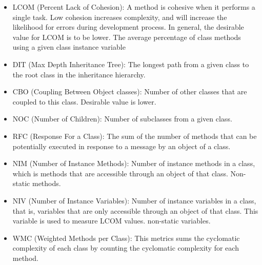 \begin{itemize}
\item LCOM (Percent Lack of Cohesion): A method is cohesive when it performs a single task. Low cohesion increases complexity, and will increase the likelihood for errors during development process. In general, the desirable value for LCOM is to be lower. The average percentage of class methods using a given class instance variable

\item DIT (Max Depth Inheritance Tree): The longest path from a given class to the root class in the inheritance hierarchy.

\item CBO (Coupling Between Object classes): Number of other classes that are coupled to this class. Desirable value is lower. 

\item NOC (Number of Children): Number of subclasses from a given class.

\item RFC (Response For a Class): The sum of the number of methods that can be potentially executed in response to a message by an object of a class.

\item NIM (Number of Instance Methods): Number of instance methods in a class, which is methods that are accessible through an object of that class. Non-static methods.

\item NIV (Number of Instance Variables): Number of instance variables in a class, that is, variables that are only accessible through an object of that class. This variable is used to measure LCOM values. non-static variables.

\item WMC (Weighted Methods per Class): This metrics sums the cyclomatic complexity of each class by counting the cyclomatic complexity for each method.
\end{itemize}




